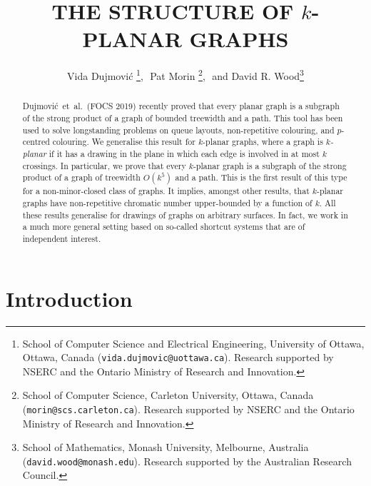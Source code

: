 \documentclass{patmorin}
\title{\MakeUppercase{The Structure of $k$-Planar Graphs}}
\author{Vida Dujmovi\'c%
        \thanks{School of Computer Science and Electrical Engineering,
                University of Ottawa, Ottawa, Canada (\texttt{vida.dujmovic@uottawa.ca}).
                Research  supported by NSERC and the Ontario Ministry of Research and Innovation.},\,\,
        Pat Morin%
        \thanks{School of Computer Science, Carleton University, Ottawa, Canada (\texttt{morin@scs.carleton.ca}).                 Research  supported by NSERC and the Ontario Ministry of Research and Innovation.},\,\, and
        David R. Wood\thanks{School of Mathematics, Monash University, Melbourne, Australia (\texttt{david.wood@monash.edu}). Research supported by the Australian Research Council.}
}
\renewcommand{\ge}{\geqslant}
\begin{document}
\begin{titlepage}
\maketitle

\begin{abstract}
Dujmovi\'c~et~al.~(FOCS 2019) recently proved that every planar graph is a subgraph of the strong product of a graph of bounded treewidth and a path. This tool has been used to solve longstanding problems on queue layouts, non-repetitive colouring, and $p$-centred colouring. %
We generalise this result for $k$-planar graphs, where a graph is \emph{$k$-planar} if it has a drawing in the plane in which each edge is involved in at most $k$ crossings. In particular, we prove that every $k$-planar graph is a subgraph of the strong product of a graph of treewidth $O(k^5)$ and a path. This is the first result of this type for a non-minor-closed class of graphs. It implies, amongst other results, that $k$-planar graphs have non-repetitive chromatic number upper-bounded by a function of $k$. All these results generalise for drawings of graphs on arbitrary surfaces. In fact, we work in a much more general setting based on so-called shortcut systems that are of independent interest. 
\end{abstract}
\end{titlepage}


\tableofcontents
\newpage
\section{Introduction}
\label{Introduction}
\end{document}
